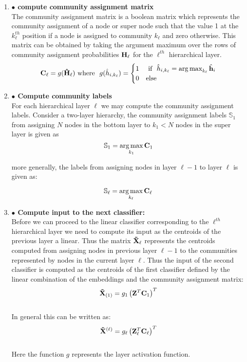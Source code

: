 \documentclass[a4paper,12pt]{article}
\DeclareMathOperator*{\argmax}{arg\,max}
\begin{document}
\begin{itemize}
\begin{enumerate}
{\begin{enumerate}
				
				\item[]{\textbf{$\bullet$ compute community assignment matrix} \\ 
					The community assignment matrix is a boolean matrix which represents the community assignment of a node or super node such that the value 1 at the $k_\ell^{th}$ position if a node is assigned to community $k_\ell$ and zero otherwise. This matrix can be obtained by taking the argument maximum over the rows of community assignment probabilities ${\bf H}_\ell$ for the $\ell^{th}$ hierarchical layer.  
					\[{\bf C}_{\ell} = g({\bf \hat{H}}_{\ell}) \ \text{where} \ \  g(\hat{h}_{i,k_\ell}) = 
					\begin{cases} 1 & \ \text{if} \ \ \hat{h}_{i,k_\ell} = \argmax_{k_\ell} \hat{\bf h}_i \\ %
						0 & \text{else} %
					\end{cases}\]}
				
				\item[]{\textbf{$\bullet$ Compute community labels} \\
					For each hierarchical layer $\ell$ we may compute the community assignment labels. Consider a two-layer hierarchy, the community assignment labels $\mathbb{S}_1$ from assigning $N$ nodes in the bottom layer to $k_1 < N$ nodes in the super layer is given as 
					\[\mathbb{S}_1 = \argmax_{k_1} {\bf C}_1 \]
					
					more generally, the labels from assigning nodes in layer $\ell - 1$ to layer $\ell$ is given as:
					
					\[ \mathbb{S}_\ell = \argmax_{k_\ell} {\bf C}_{\ell}\]}
				
				\item[]{\textbf{$\bullet$ Compute input to the next classifier:}  \\
					Before we can proceed to the linear classifier corresponding to the $\ell^{th}$ hierarchical layer we need to compute its input as the centroids of the previous layer a linear. Thus the matrix ${\bf \tilde X}_\ell$ represents the centroids computed from assigning nodes in previous layer $\ell - 1$ to the communities represented by nodes in the current layer $\ell$. Thus the input of the second classifier is computed as the centroids of the first classifier defined by the linear combination of the embeddings and the community assignment matrix: 
					\[ {\bf \tilde X}_{(1)} = g_1\left({\bf Z}^T {\bf C}_{1}\right)^T\] 
					\\
					In general this can be written as: 
					\[ {\bf \tilde X}^{(\ell)} = g_\ell\left({\bf Z}_{\ell}^T {\bf C}_{\ell}\right)^T\] 
					\\
					Here the function $g$ represents the layer activation function. \\
					
}
\end{enumerate}}
\end{enumerate}
\end{itemize}
\end{document}
